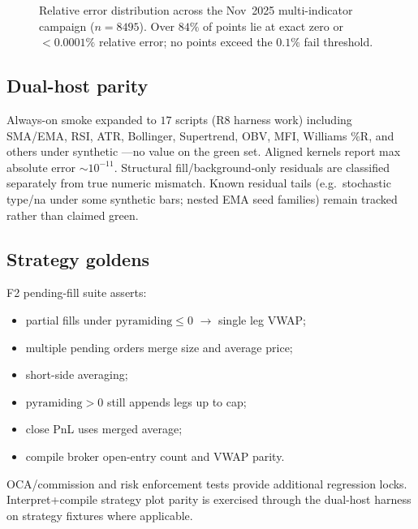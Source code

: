 \documentclass[11pt,a4paper]{article}
\begin{document}
\begin{figure}[t]
\centering
{}
\caption{Relative error distribution across the Nov~2025 multi-indicator
campaign ($n=8495$). Over $84\%$ of points lie at exact zero or
$<0.0001\%$ relative error; no points exceed the $0.1\%$ fail threshold.}
\label{fig:err-hist}
\end{figure}

\subsection{Dual-host parity}
Always-on smoke expanded to $17$ scripts (R8 harness work) including SMA/EMA,
RSI, ATR, Bollinger, Supertrend, OBV, MFI, Williams $\%$R, and others under
synthetic ---no value  on the green set.
Aligned kernels report max absolute error $\sim 10^{-11}$.
Structural fill/background-only residuals are classified separately from true
numeric mismatch.
Known residual tails (e.g.\ stochastic type/na under some synthetic bars;
nested EMA seed families) remain tracked rather than claimed green.

\subsection{Strategy goldens}
F2 pending-fill suite asserts:
\begin{itemize}[leftmargin=*]
  \item partial fills under $\mathrm{pyramiding}\le 0$ $\to$ single leg VWAP;
  \item multiple pending orders merge size and average price;
  \item short-side averaging;
  \item $\mathrm{pyramiding}>0$ still appends legs up to cap;
  \item close PnL uses merged average;
  \item compile broker open-entry count and VWAP parity.
\end{itemize}
OCA/commission and risk enforcement tests provide additional regression locks.
Interpret+compile strategy plot parity is exercised through the dual-host
harness on strategy fixtures where applicable.
\end{document}
